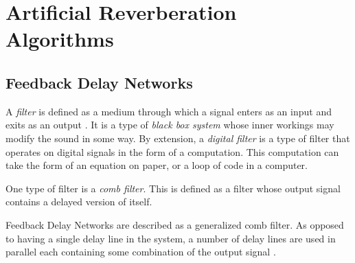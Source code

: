 \chapter{Artificial Reverberation Algorithms}
\section{Feedback Delay Networks}
A \textit{filter} is defined as a medium through which a signal enters as an input and exits as an output \cite{FILTERS07}. It is a type of \textit{black box system} whose inner workings may modify the sound in some way. By extension, a \textit{digital filter} is a type of filter that operates on digital signals in the form of a computation. This computation can take the form of an equation on paper, or a loop of code in a computer.

One type of filter is a \textit{comb filter}. This is defined as a filter whose output signal contains a delayed version of itself.

Feedback Delay Networks are described as a generalized comb filter. As opposed to having a single delay line in the system, a number of delay lines are used in parallel each containing some combination of the output signal \cite{PUCKE}.
